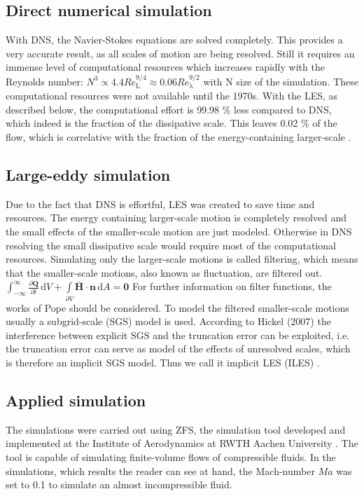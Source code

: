 \documentclass[11pt,a4paper,openany,oneside,parskip=half*]{article}
\renewcommand*\vec[1]{\boldsymbol{#1}}
\begin{document}
\subsection{Direct numerical simulation}
With DNS, the Navier-Stokes equations are solved completely. This provides a very accurate result, as all scales of motion are being resolved. Still it requires an immense level of computational resources which increases rapidly with the Reynolds number: $N^3 \propto 4.4 Re_{\mathrm{L}}^{9/4} \approx 0.06 Re_{\mathrm{\lambda}}^{9/2}$ with N size of the simulation. These computational resources were not available until the 1970s. With the LES, as described below, the computational effort is 99.98 \% less compared to DNS, which indeed is the fraction of the dissipative scale. This leaves 0.02 \% of the flow, which is correlative with the fraction of the energy-containing larger-scale \cite{turbulentFlows}.%
\subsection{Large-eddy simulation}
Due to the fact that DNS is effortful, LES was created to save time and resources. The energy containing larger-scale motion is completely resolved and the small effects of the smaller-scale motion are just modeled. Otherwise in DNS resolving the small dissipative scale would require most of the computational resources.
\newline%
Simulating only the larger-scale motions is called filtering, which means that the smaller-scale motions, also known as fluctuation, are filtered out.  $\int_{-\infty}^{\infty} \frac{\partial{\vec{Q}}}{\partial{t}} \, \mathrm{d} V+ \int\limits_{\partial{V}} \vec{\bar{H}} \cdot \vec{n} \, \mathrm{d} A = \vec0$ For further information on filter functions, the works of Pope \cite{turbulentFlows} should be considered. To model the filtered smaller-scale motions usually a subgrid-scale (SGS) model is used. According to Hickel (2007) the interference between explicit SGS and the truncation error can be exploited, i.e. the truncation error can serve as model of the effects of unresolved scales, which is therefore an implicit SGS model. Thus we call it implicit LES (ILES) \cite{implicitLES}. %
\subsection{Applied simulation}
The simulations were carried out using ZFS, the simulation tool developed and implemented at the Institute of Aerodynamics at RWTH Aachen University 
\cite{anAdaptiveMultilevelMultigridFormulationForCartesianHierarchicalGridMethods} \cite{aStrictlyConservativeCartesianCutCellMethodForCompressibleViscousFlowsOnAdaptiveGrids}. 
The tool is capable of simulating finite-volume flows of compressible fluids. In the simulations, which results the reader can see at hand, the Mach-number $Ma$ was set to 0.1 to simulate an almost incompressible fluid.
\newline
\pagebreak
\end{document}
